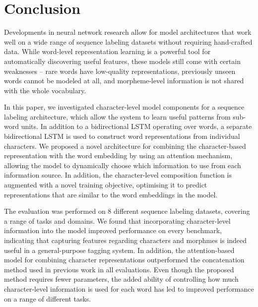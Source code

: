 \documentclass[11pt]{article}
\begin{document}
\section{Conclusion}

Developments in neural network research allow for model architectures that work well on a wide range of sequence labeling datasets without requiring hand-crafted data.
While word-level representation learning is a powerful tool for automatically discovering useful features, these models still come with certain weaknesses -- rare words have low-quality representations, previously unseen words cannot be modeled at all, and morpheme-level information is not shared with the whole vocabulary.

In this paper, we investigated character-level model components for a sequence labeling architecture, which allow the system to learn useful patterns from sub-word units.
In addition to a bidirectional LSTM operating over words, a separate bidirectional LSTM is used to construct word representations from individual characters. We proposed a novel architecture for combining the character-based representation with the word embedding by using an attention mechanism, allowing the model to dynamically choose which information to use from each information source. In addition, the character-level composition function is augmented with a novel training objective, optimising it to predict representations that are similar to the word embeddings in the model.

The evaluation was performed on 8 different sequence labeling datasets, covering a range of tasks and domains. We found that incorporating character-level information into the model improved performance on every benchmark, indicating that capturing features regarding characters and morphmes is indeed useful in a general-purpose tagging system. In addition, the attention-based model for combining character representations outperformed the concatenation method used in previous work in all evaluations. Even though the proposed method requires fewer parameters, the added ability of controlling how much character-level information is used for each word has led to  improved performance on a range of different tasks.



\end{document}
